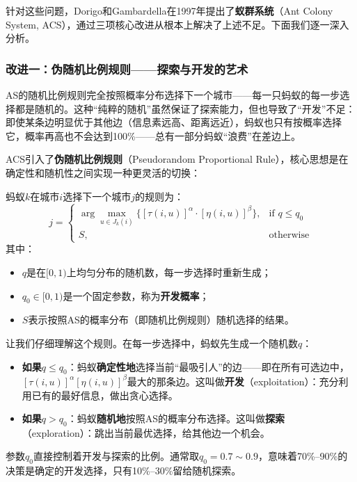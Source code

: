 \documentclass[lang=cn,zihao=-4,a4paper,fontset=windows]{beautybook}
\begin{document}
针对这些问题，Dorigo和Gambardella在1997年提出了\textbf{蚁群系统}（Ant Colony System, ACS），通过三项核心改进从根本上解决了上述不足。下面我们逐一深入分析。

\subsubsection{改进一：伪随机比例规则——探索与开发的艺术}

AS的随机比例规则完全按照概率分布选择下一个城市——每一只蚂蚁的每一步选择都是随机的。这种“纯粹的随机”虽然保证了探索能力，但也导致了“开发”不足：即使某条边明显优于其他边（信息素远高、距离远近），蚂蚁也只有按概率选择它，概率再高也不会达到100\%——总有一部分蚂蚁“浪费”在差边上。

ACS引入了\textbf{伪随机比例规则}（Pseudorandom Proportional Rule），核心思想是在确定性和随机性之间实现一种更灵活的切换：

\begin{definition}[][伪随机比例规则]
蚂蚁$k$在城市$i$选择下一个城市$j$的规则为：
\[
j =
\begin{cases}
\displaystyle\arg\max_{u \in J_k(i)} \big\{[\tau(i,u)]^\alpha \cdot [\eta(i,u)]^\beta\big\}, & \text{if } q \leq q_0 \\[12pt]
S, & \text{otherwise}
\end{cases}
\]
其中：
\begin{itemize}
    \item $q$是在$[0,1)$上均匀分布的随机数，每一步选择时重新生成；
    \item $q_0 \in [0,1)$是一个固定参数，称为\textbf{开发概率}；
    \item $S$表示按照AS的概率分布（即随机比例规则）随机选择的结果。
\end{itemize}
\end{definition}

让我们仔细理解这个规则。在每一步选择中，蚂蚁先生成一个随机数$q$：
\begin{itemize}
    \item \textbf{如果$q \leq q_0$}：蚂蚁\textbf{确定性地}选择当前“最吸引人”的边——即在所有可选边中，$[\tau(i,u)]^\alpha [\eta(i,u)]^\beta$最大的那条边。这叫做\textbf{开发}（exploitation）：充分利用已有的最好信息，做出贪心选择。
    \item \textbf{如果$q > q_0$}：蚂蚁\textbf{随机地}按照AS的概率分布选择。这叫做\textbf{探索}（exploration）：跳出当前最优选择，给其他边一个机会。
\end{itemize}

参数$q_0$直接控制着开发与探索的比例。通常取$q_0 = 0.7 \sim 0.9$，意味着70\%--90\%的决策是确定的开发选择，只有10\%--30\%留给随机探索。
\end{document}
